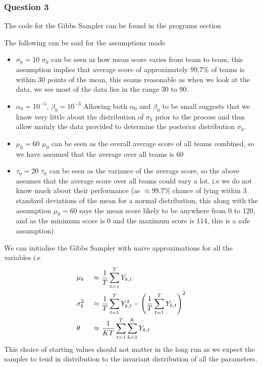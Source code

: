 \documentclass[11pt]{article} %
\let\originalleft\left
\let\originalright\right
\renewcommand{\left}{\mathopen{}\mathclose\bgroup\originalleft}
\renewcommand{\right}{\aftergroup\egroup\originalright}
\begin{document}
\subsubsection*{Question 3}
The code for the Gibbs Sampler can be found in the programs section

The following can be said for the assumptions made
\begin{itemize}
	\item $\sigma_0 = 10$
	\subitem $\sigma_0$ can be seen as how mean score varies from team to team, this assumption implies that average score of approximately $99.7\%$ of teams is within 30 points of the mean, this seams reasonable as when we look at the data, we see most of the data lies in the range $30$ to $90$.
	\item $\alpha_0 = 10^{-5}$, $\beta_0 = 10^{-3}$
	\subitem Allowing both $\alpha_0$ and $\beta_0$ to be small suggests that we know very little about the distribution of $\sigma_k$ prior to the process and thus allow mainly the data provided to determine the posterior distribution $\sigma_k$.
	\item $\mu_0=60$
	\subitem $\mu_0$ can be seen as the overall average score of all teams combined, so we have assumed that the average over all teams is 60
	\item $\tau_0=20$
	\subitem $\tau_0$ can be seen as the variance of the average score, so the above assumes that the average score over all teams could vary a lot, i.e we do not know much about their performance (as $\approx 99.7\%$ chance of lying within 3 standard deviations of the mean for a normal distribution, this along with the assumption $\mu_0=60$ says the mean score likely to be anywhere from 0 to 120, and as the minimum score is 0 and the maximum score is 114, this is a safe assumption)
\end{itemize}
We can initialise the Gibbs Sampler with naive approximations for all the variables i.e
\begin{alignat*}{2}
	& \mu_k &\ \approx\ & \frac{1}{T}\sum_{t=1}^{T}{Y_{k, t}} \\
	& \sigma_k^2 &\ \approx\ & \frac{1}{T}\sum_{t=1}^{T}{Y_{k, t}^2} - \left(\frac{1}{T}\sum_{t=1}^{T}{Y_{k, t}}\right)^2 \\
	& \theta &\ \approx\ & \frac{1}{KT}\sum_{t=1}^{T}{\sum_{k=1}^{K}{Y_{k, t}}}
\end{alignat*}
This choice of starting values should not matter in the long run as we expect the sampler to tend in distribution to the invariant distribution of all the parameters.
\end{document}
